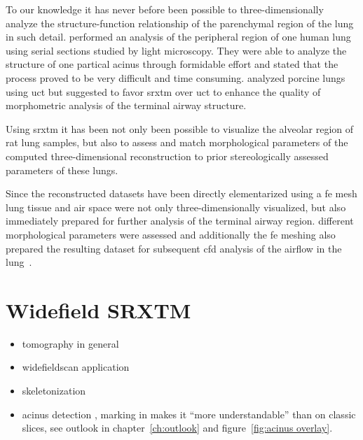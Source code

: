 To our knowledge it has never before been possible to three-dimensionally analyze the structure-function relationship of the parenchymal region of the lung in such detail. \citet{Berend1991} performed an analysis of the peripheral region of one human lung using serial sections studied by light microscopy. They were able to analyze the structure of one partical acinus through formidable effort and stated that the process proved to be very difficult and time consuming. \citet{Litzlbauer2006} analyzed porcine lungs using \ac{uct} but suggested to favor \ac{srxtm} over \ac{uct} to enhance the quality of morphometric analysis of the terminal airway structure.

Using \ac{srxtm} it has been not only been possible to visualize the alveolar region of rat lung samples, but also to assess and match morphological parameters of the computed three-dimensional reconstruction to prior stereologically assessed parameters of these lungs.

Since the reconstructed datasets have been directly elementarized using a \ac{fe} mesh lung tissue and air space were not only three-dimensionally visualized, but also immediately prepared for further analysis of the terminal airway region. different morphological parameters were assessed and additionally the \ac{fe} meshing also prepared the resulting dataset for subsequent \ac{cfd} analysis of the airflow in the lung~.

\section{Widefield SRXTM}
\begin{itemize}
	\item tomography in general
	\item widefieldscan application
	\item skeletonization
	\item acinus detection \threed, marking in \twod makes it ``more understandable'' than on classic slices, see outlook in chapter~\ref{ch:outlook} and figure~\ref{fig:acinus overlay}.
\end{itemize}